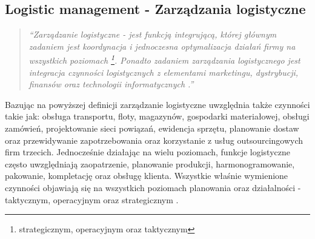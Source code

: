 	\subsection{Logistic management - Zarządzania logistyczne}
		\begin{quote}
			\textit{
				``\emph{Zarządzanie logistyczne} - jest funkcją integrującą, której głównym zadaniem jest
				koordynacja i jednoczesna optymalizacja działań firmy na wszystkich poziomach
				\footnote{strategicznym, operacyjnym oraz taktycznym}. Ponadto zadaniem \emph{zarządzania logistycznego} jest
				integracja czynności logistycznych z elementami marketingu, dystrybucji, finansów oraz technologii
				informatycznych \cite{csmp_logistic_management}.''
			}
		\end{quote}
		
		Bazując na powyższej definicji zarządzanie logistyczne uwzględnia także czynności takie jak:
		obsługa transportu, floty, magazynów, gospodarki materiałowej, obsługi zamówień, 
		projektowanie sieci powiązań, ewidencja sprzętu,
		planowanie dostaw oraz przewidywanie zapotrzebowania oraz korzystanie z 
		usług outsourcingowych firm trzecich. Jednocześnie dzia\-łając na wielu poziomach, 
		funkcje logistyczne często uwzględniają zaopatrzenie, plano\-wanie produkcji, harmonogramowanie, 
		pakowanie, kompletację oraz obsługę klienta. Wszystkie właśnie wymienione czynności
		objawiają się na wszystkich poziomach planowania oraz działalności - taktycznym, operacyjnym oraz
		strategicznym \cite{csmp_logistic_management}.

